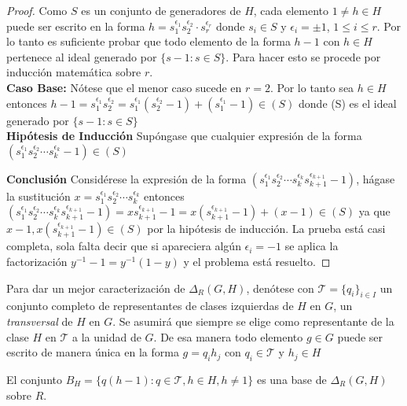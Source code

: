 \begin{proof}
Como $S$ es un conjunto de generadores de $H$, cada elemento $1 \neq h \in H$ puede ser escrito en la forma $h=s_1^{\epsilon_1} s_2^{\epsilon_2} \cdot s_r^{\epsilon_r} $ donde $s_i \in S$ y $\epsilon_i =\pm 1$, $1 \leq i \leq r$. Por lo tanto es suficiente probar que todo elemento de la forma $h-1$ con $h \in H$  pertenece al ideal generado por $\{s-1 : s \in S \}$. Para hacer esto se procede por inducción matemática sobre $r$. \\

\textbf{Caso Base:} Nótese que el menor caso sucede en $r =2$. Por lo tanto sea $h \in H$ entonces $h-1 = s_1^{\epsilon_1} s_2^{\epsilon_2} = s_1^{\epsilon_1}( s_2^{\epsilon_2} -1 ) + ( s_1^{\epsilon_1} -1 ) \in (S)  $ donde (S) es el ideal generado por $\{ s-1 : s \in S \}$ \\ 

\textbf{Hipótesis de Inducción} 
Supóngase que cualquier expresión de la forma $ (s_1^{\epsilon_1} s_2^{\epsilon_2} \cdots s_k^{\epsilon_k} -1)\in (S) $


\textbf{Conclusión}
Considérese la expresión de la forma $ (s_1^{\epsilon_1} s_2^{\epsilon_2} \cdots s_k^{\epsilon_k}s_{k+1}^{\epsilon_{k+1}} -1) $, hágase la sustitución $x =  s_1^{\epsilon_1} s_2^{\epsilon_2} \cdots s_k^{\epsilon_k} $ entonces $ (s_1^{\epsilon_1} s_2^{\epsilon_2} \cdots s_k^{\epsilon_k}s_{k+1}^{\epsilon_{k+1}} -1)  = x s_{k+1}^{\epsilon_{k+1}} -1 = x( s_{k+1}^{\epsilon_{k+1}} -1 ) + (x-1) \in (S) $ ya que $x-1, x( s_{k+1}^{\epsilon_{k+1}} -1 ) \in (S)$ por la hipótesis de inducción. La prueba está casi completa, sola falta decir que si apareciera algún $\epsilon_i = -1$ se aplica la factorización $y^{-1}-1 = y^{-1}(1-y)$ y el problema está resuelto.\qedhere
\end{proof}


Para dar un mejor caracterización de $\Delta_R (G,H)$, denótese con $\mathcal{T} = \{q_i\}_{i \in I}$ un conjunto completo de representantes de clases izquierdas de $H$ en $G$, un \textit{transversal} de $H$ en $G$. Se asumirá que siempre se elige como representante de la clase $H$ en $\mathcal{T}$ a la unidad de $G$. De esa manera todo elemento $g \in G$ puede ser escrito de manera única en la forma $g = q_ih_j$ con $q_i \in \mathcal{T}$ y $h_j \in H$


\begin{proposicion}
El conjunto $B_H = \{q(h-1) : q \in \mathcal{T}, h \in H, h \neq 1  \}$ es una base de $\Delta_R(G,H)$ sobre $R$.
\end{proposicion} 

